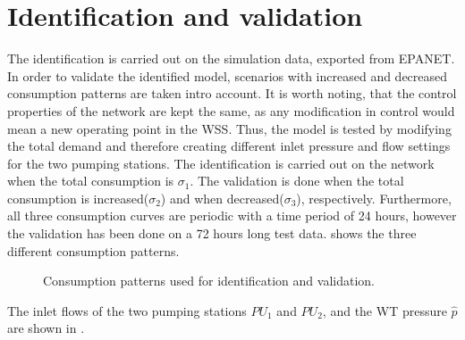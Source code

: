 \section{Identification and validation}
\label{identification_and_validation_of_the_output_eq} 

The identification is carried out on the simulation data, exported from EPANET. In order to validate the identified model, scenarios with increased and decreased consumption patterns are taken intro account. It is worth noting, that the control properties of the network are kept the same, as any modification in control would mean a new operating point in the WSS. Thus, the model is tested by modifying the total demand and therefore creating different inlet pressure and flow settings for the two pumping stations. The identification is carried out on the network when the total consumption is $\sigma_1$. The validation is done when the total consumption is increased($\sigma_2$) and when decreased($\sigma_3$), respectively. Furthermore, all three consumption curves are periodic with a time period of 24 hours, however the validation has been done on a 72 hours long test data.  shows the three different consumption patterns.

 \begin{figure}[H]
 \centering
  
 \vspace{-2.5mm}
 \caption{Consumption patterns used for identification and validation.}
 \label{fig:sigma123}
 \end{figure}

 \vspace{-3mm}

 The inlet flows of the two pumping stations $PU_1$ and $PU_2$, and the WT pressure $\hat{p}$ are shown in . 

 \vspace{-3mm}

 \begin{figure}[H]
 \centering
  
 \vspace{-2.5mm}
 \label{fig:dk_sigma1}
 \end{figure}

